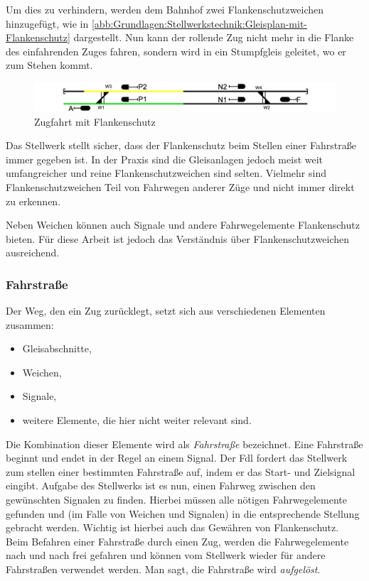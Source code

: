 Um dies zu verhindern, werden dem Bahnhof zwei Flankenschutzweichen hinzugefügt, wie in \autoref{abb:Grundlagen:Stellwerkstechnik:Gleisplan-mit-Flankenschutz} dargestellt. Nun kann der rollende Zug nicht mehr in die Flanke des einfahrenden Zuges fahren, sondern wird in ein Stumpfgleis geleitet, wo er zum Stehen kommt.

\begin{figure}[H]
    \centering
    \includegraphics[width=\textwidth]{Assets/Images/2-Grundlagen/Gleisplan-Einfacher-Bahnhof-Mit-Flankenschutz.png}
    \caption{Zugfahrt mit Flankenschutz}\label{abb:Grundlagen:Stellwerkstechnik:Gleisplan-mit-Flankenschutz}
\end{figure}

Das Stellwerk stellt sicher, dass der Flankenschutz beim Stellen einer Fahrstraße immer gegeben ist. In der Praxis sind die Gleisanlagen jedoch meist weit umfangreicher und reine Flankenschutzweichen sind selten. Vielmehr sind Flankenschutzweichen Teil von Fahrwegen anderer Züge und nicht immer direkt zu erkennen.

Neben Weichen können auch Signale und andere Fahrwegelemente Flankenschutz bieten. Für diese Arbeit ist jedoch das Verständnis über Flankenschutzweichen ausreichend.

\subsubsection*{Fahrstraße}\label{text:Grundlagen:Stellwerkstechnik:Sicherung-des-Schienenverkehrs:Fahrstrasse}

Der Weg, den ein Zug zurücklegt, setzt sich aus verschiedenen Elementen zusammen:

\begin{itemize}
    \item Gleisabschnitte,
    \item Weichen,
    \item Signale,
    \item weitere Elemente, die hier nicht weiter relevant sind.
\end{itemize}

Die Kombination dieser Elemente wird als \textit{Fahrstraße} bezeichnet. Eine Fahrstraße beginnt und endet in der Regel an einem Signal. Der \ac{Fdl} fordert das Stellwerk zum stellen einer bestimmten Fahrstraße auf, indem er das Start- und Zielsignal eingibt. Aufgabe des Stellwerks ist es nun, einen Fahrweg zwischen den gewünschten Signalen zu finden. Hierbei müssen alle nötigen Fahrwegelemente gefunden und (im Falle von Weichen und Signalen) in die entsprechende Stellung gebracht werden. Wichtig ist hierbei auch das Gewähren von Flankenschutz. Beim Befahren einer Fahrstraße durch einen Zug, werden die Fahrwegelemente nach und nach frei gefahren und können vom Stellwerk wieder für andere Fahrstraßen verwendet werden. Man sagt, die Fahrstraße wird \textit{aufgelöst}.

